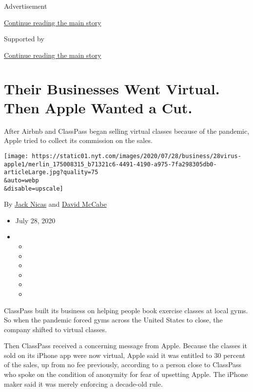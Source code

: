 Advertisement

\protect\hyperlink{after-top}{Continue reading the main story}

Supported by

\protect\hyperlink{after-sponsor}{Continue reading the main story}

\hypertarget{their-businesses-went-virtual-then-apple-wanted-a-cut}{%
\section{Their Businesses Went Virtual. Then Apple Wanted a
Cut.}\label{their-businesses-went-virtual-then-apple-wanted-a-cut}}

After Airbnb and ClassPass began selling virtual classes because of the
pandemic, Apple tried to collect its commission on the sales.

\texttt{[image: https://static01.nyt.com/images/2020/07/28/business/28virus-apple1/merlin\_175008315\_b71321c6-4491-4190-a975-7fa298305db0-articleLarge.jpg?quality=75\\\&auto=webp\\\&disable=upscale]}

By \href{https://www.nytimes.com/by/jack-nicas}{Jack Nicas} and
\href{https://www.nytimes.com/by/david-mccabe}{David McCabe}

\begin{itemize}
\item
  July 28, 2020
\item
  \begin{itemize}
  \item
  \item
  \item
  \item
  \item
  \item
  \end{itemize}
\end{itemize}

ClassPass built its business on helping people book exercise classes at
local gyms. So when the pandemic forced gyms across the United States to
close, the company shifted to virtual classes.

Then ClassPass received a concerning message from Apple. Because the
classes it sold on its iPhone app were now virtual, Apple said it was
entitled to 30 percent of the sales, up from no fee previously,
according to a person close to ClassPass who spoke on the condition of
anonymity for fear of upsetting Apple. The iPhone maker said it was
merely enforcing a decade-old rule.

